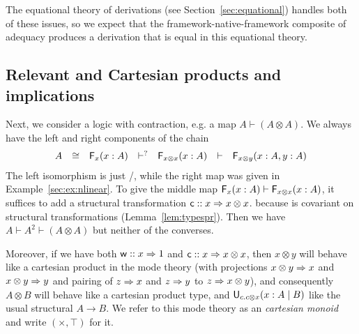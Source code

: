 The equational theory of derivations (see Section~\ref{sec:equational})
handles both of these issues, so we expect that the
framework-native-framework composite of adequacy produces a derivation
that is equal in this equational theory.  

\subsection{Relevant and Cartesian products and implications}
\label{sec:ex:relevant-cartesian}

Next, we consider a logic with contraction, e.g. a map
$A \vdash (A \otimes A)$.  We always have the left and right components
of the chain
\[
\begin{array}{llllllll}
A & \cong & \mathsf{F}_{x}(x:A)  & \vdash^? & \mathsf{F}_{x \otimes x}(x:A) & \vdash & \mathsf{F}_{x \otimes y}(x:A, y : A)
\end{array}
\]
The left isomorphism is just \FL/\FR, while the right map was given in
Example~\ref{sec:ex:nlinear}.  To give the middle map $\mathsf{F}_{x}(x:A) \vdash
\mathsf{F}_{x \otimes x}(x:A)$, it suffices to add a structural transformation
$\mathsf{c} :: x \Rightarrow x \otimes x$.  because  is covariant on
structural transformations (Lemma~\ref{lem:typespr}).  Then we have $A
\vdash A^2 \vdash (A \otimes A)$ but neither of the converses.

Moreover, if we have both $\mathsf{w} :: x \Rightarrow 1$ and $\mathsf{c} :: x \Rightarrow x
\otimes x$, then $x \otimes y$ will behave like a cartesian product in
the mode theory (with projections $x \otimes y \Rightarrow x$ and $x \otimes y
\Rightarrow y$ and pairing of $z \Rightarrow x$ and $z \Rightarrow y$ to $z \Rightarrow x \otimes
y$), and consequently $A \otimes B$ will behave like a cartesian product
type, and $\mathsf{U}_{c.c \otimes x}(x:A \mid B)$ like the usual structural $A \to B$.
We refer to this mode theory as an
\emph{cartesian monoid} and write $(\times,\top)$ for it.


